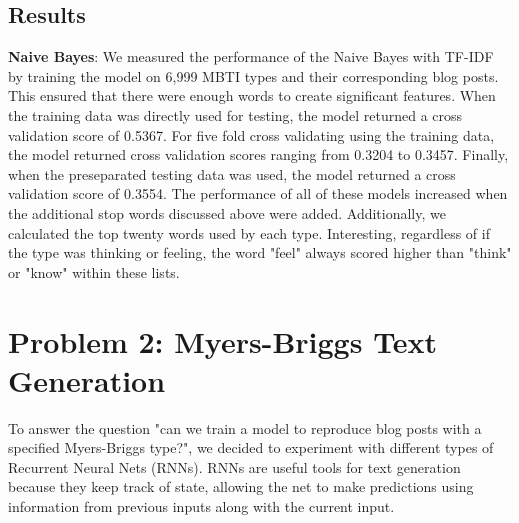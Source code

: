 \documentclass{article}
\begin{document}
\subsection{Results}
\textbf{Naive Bayes}: We measured the performance of the Naive Bayes with TF-IDF by training the model on 6,999 MBTI types and their corresponding blog posts. This ensured that there were enough words to create significant features. When the training data was directly used for testing, the model returned a cross validation score of 0.5367. For five fold cross validating using the training data, the model returned cross validation scores ranging from 0.3204 to 0.3457. Finally, when the preseparated testing data was used, the model returned a cross validation score of 0.3554. The performance of all of these models increased when the additional stop words discussed above were added. Additionally, we calculated the top twenty words used by each type. Interesting, regardless of if the type was thinking or feeling, the word "feel" always scored higher than "think" or "know" within these lists. 

\section{Problem 2: Myers-Briggs Text Generation}
To answer the question "can we train a model to reproduce blog posts with a specified Myers-Briggs type?", we decided to experiment with different types of Recurrent Neural Nets (RNNs). RNNs are useful tools for text generation because they keep track of state, allowing the net to make predictions using information from previous inputs along with the current input.
\end{document}
